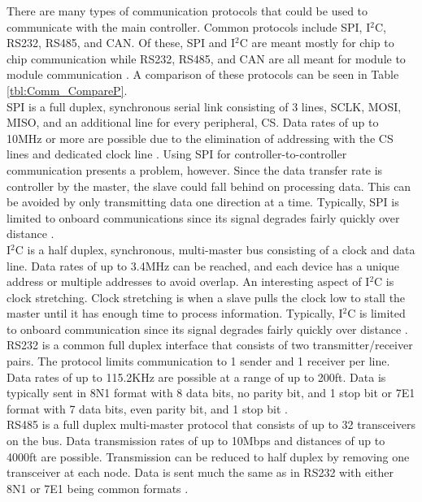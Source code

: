 There are many types of communication protocols that could be used to communicate with the main controller. Common protocols include SPI, I$^2$C, RS232, RS485, and CAN. Of these, SPI and I$^2$C are meant mostly for chip to chip communication while RS232, RS485, and CAN are all meant for module to module communication \cite{SerialCompared}. A comparison of these protocols can be seen in Table \ref{tbl:Comm_CompareP}. \\
\newline
SPI is a full duplex, synchronous serial link consisting of 3 lines, SCLK, MOSI, MISO, and an additional line for every peripheral, CS. Data rates of up to 10MHz or more are possible due to the elimination of addressing with the CS lines and dedicated clock line \cite{SerialCompared}. Using SPI for controller-to-controller communication presents a problem, however. Since the data transfer rate is controller by the master, the slave could fall behind on processing data. This can be avoided by only transmitting data one direction at a time. Typically, SPI is limited to onboard communications since its signal degrades fairly quickly over distance \cite{CANvSPI}. \\
\newline
I$^2$C is a half duplex, synchronous, multi-master bus consisting of a clock and data line. Data rates of up to 3.4MHz can be reached, and each device has a unique address or multiple addresses to avoid overlap. An interesting aspect of I$^2$C is clock stretching. Clock stretching is when a slave pulls the clock low to stall the master until it has enough time to process information. Typically, I$^2$C is limited to onboard communication since its signal degrades fairly quickly over distance \cite{SerialCompared}. \\
\newline
RS232 is a common full duplex interface that consists of two transmitter/receiver pairs. The protocol limits communication to 1 sender and 1 receiver per line. Data rates of up to 115.2KHz are possible at a range of up to 200ft. Data is typically sent in 8N1 format with 8 data bits, no parity bit, and 1 stop bit or 7E1 format with 7 data bits, even parity bit, and 1 stop bit \cite{SerialCompared}. \\
\newline
RS485 is a full duplex multi-master protocol that consists of up to 32 transceivers on the bus. Data transmission rates of up to 10Mbps and distances of up to 4000ft are possible. Transmission can be reduced to half duplex by removing one transceiver at each node. Data is sent much the same as in RS232 with either 8N1 or 7E1 being common formats \cite{SerialCompared}. \\
